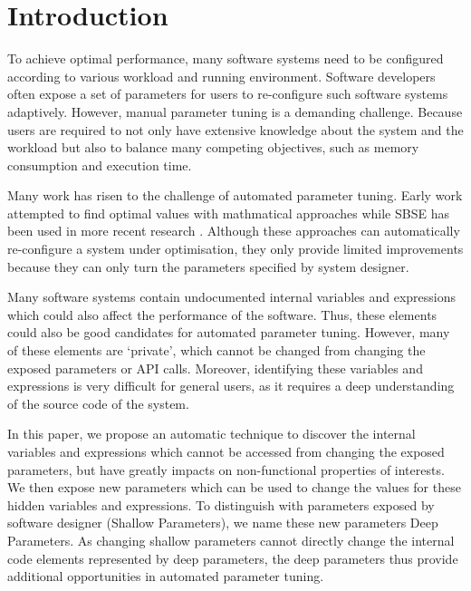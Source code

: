 
\section{Introduction}

To achieve optimal performance, many software systems need to be configured according to various workload and running environment. 
Software developers often expose a set of parameters for users to re-configure such software systems adaptively.
However, manual parameter tuning is a demanding challenge. Because users are required to not only have extensive knowledge about the system and the workload but also to balance many competing objectives, such as memory consumption and execution time.

Many work has risen to the challenge of automated parameter tuning\cite{Hoffmann:2011:DKR:1961296.1950390}. Early work attempted to find optimal values with mathmatical approaches \cite{Vuduc01statisticalmodels,autotuning,Whaley:1998:ATL:509058.509096,Tapus:2002:AHT:762761.762771} while SBSE\cite{Harman:2007:CSF:1253532.1254729} has been used in more recent research \cite{hutter2009paramils,arcuri-ssbse-2011,Hoffmann:2011:DKR:1961296.1950390}. Although these approaches can automatically re-configure a system under optimisation, they only provide limited improvements because they can only turn the parameters specified by system designer.

Many software systems contain undocumented internal variables and expressions which could also affect the performance of the software. Thus, these elements could also be good candidates for automated parameter tuning. However, many of these elements are `private', which cannot be changed from changing the exposed parameters or API calls. Moreover, identifying these variables and expressions is very difficult for general users, as it requires a deep understanding of the source code of the system. 

In this paper, we propose an automatic technique to discover the internal variables and expressions which cannot be accessed from changing the exposed parameters, but have greatly impacts on non-functional properties of interests. We then expose new parameters which can be used to change the values for these hidden variables and expressions. To distinguish with parameters exposed by software designer (Shallow Parameters), we name these new parameters Deep Parameters. As changing shallow parameters cannot directly change the internal code elements represented by deep parameters, the deep parameters thus provide additional opportunities in automated parameter tuning.

